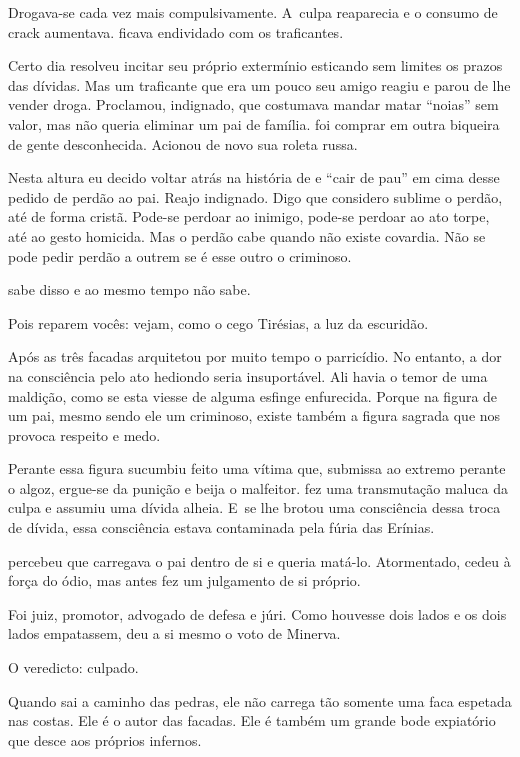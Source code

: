 Drogava-se cada vez mais compulsivamente. A~culpa reaparecia e o consumo
de crack aumentava.  ficava endividado com os traficantes.

Certo dia  resolveu incitar seu próprio extermínio esticando sem
limites os prazos das dívidas. Mas um traficante que era um pouco seu
amigo reagiu e parou de lhe vender droga. Proclamou, indignado, que
costumava mandar matar ``noias'' sem valor, mas não queria eliminar um pai
de família.  foi comprar em outra biqueira de gente desconhecida.
Acionou de novo sua roleta russa.

Nesta altura eu decido voltar atrás na história de  e ``cair de pau''
em cima desse pedido de perdão ao pai. Reajo indignado. Digo que
considero sublime o perdão, até de forma cristã. Pode-se perdoar ao
inimigo, pode-se perdoar ao ato torpe, até ao gesto homicida. Mas o
perdão cabe quando não existe covardia. Não se pode pedir perdão a
outrem se é esse outro o criminoso.

 sabe disso e ao mesmo tempo não sabe.

Pois reparem vocês: vejam, como o cego Tirésias, a luz da escuridão.

Após as três facadas  arquitetou por muito tempo o parricídio. No
entanto, a dor na consciência pelo ato hediondo seria insuportável. Ali
havia o temor de uma maldição, como se esta viesse de alguma esfinge
enfurecida. Porque na figura de um pai, mesmo sendo ele um criminoso,
existe também a figura sagrada que nos provoca respeito e medo.

Perante essa figura  sucumbiu feito uma vítima que, submissa ao
extremo perante o algoz, ergue-se da punição e beija o malfeitor.  fez
uma transmutação maluca da culpa e assumiu uma dívida alheia. E~se lhe
brotou uma consciência dessa troca de dívida, essa consciência estava
contaminada pela fúria das Erínias.

 percebeu que carregava o pai dentro de si e queria matá-lo.
Atormentado, cedeu à força do ódio, mas antes fez um julgamento de si
próprio.

Foi juiz, promotor, advogado de defesa e júri. Como houvesse dois lados
e os dois lados empatassem,  deu a si mesmo o voto de Minerva.

O veredicto: culpado.

\asterisc{}

Quando  sai a caminho das pedras, ele não carrega tão somente uma faca
espetada nas costas. Ele é o autor das facadas. Ele é também um grande
bode expiatório que desce aos próprios infernos.

